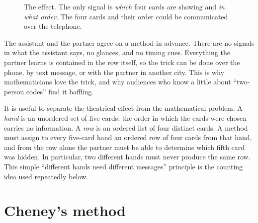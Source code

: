 \documentclass[11pt]{article}
\newcommand{\cardat}[5]{%
  \begin{scope}[shift={(#1,#2)}]
    \draw[rounded corners=2.5pt,fill=white,line width=0.6pt] (-.38,-.55) rectangle (.38,.55);
    \node[font=\footnotesize\bfseries,text=#5] at (-.17,.32) {#3};
    \node[font=\Large,text=#5] at (.06,-.14) {$#4$};
  \end{scope}}
\newcommand{\backat}[2]{%
  \begin{scope}[shift={(#1,#2)}]
    \draw[rounded corners=2.5pt,fill=blue!55!black,line width=0.6pt] (-.38,-.55) rectangle (.38,.55);
    \draw[rounded corners=1.5pt,white,line width=0.5pt] (-.3,-.47) rectangle (.3,.47);
    \draw[white,line width=0.4pt] (-.3,-.47) -- (.3,.47) (-.3,.47) -- (.3,-.47);
  \end{scope}}
\begin{document}
\begin{figure}[ht]
\centering
{}
\caption{The effect. The only signal is \emph{which} four cards are showing and
\emph{in what order}. The four cards and their order could be communicated over the telephone.}
\label{fig:effect}
\end{figure}

The assistant and the partner agree on a method in advance. There are no signals in what the assistant says, no glances, and no timing cues. Everything the partner learns is contained in the row itself, so the trick can be done over the phone, by text message, or with the partner in another city. This is why mathematicians love the trick, and why audiences who know a little about ``two-person codes'' find it baffling.


It is useful to separate the theatrical effect from the mathematical problem.
A \emph{hand} is an unordered set of five cards: the order in which the cards were chosen carries no information.
A \emph{row} is an ordered list of four distinct cards. A method must assign to every five-card hand an ordered row of four cards from that hand, and from the row alone the partner must be able to determine which fifth card was hidden.
In particular, two different hands must never produce the same row. This simple ``different hands need different messages'' principle is the counting idea used repeatedly below.

\section{Cheney's method}
\end{document}
